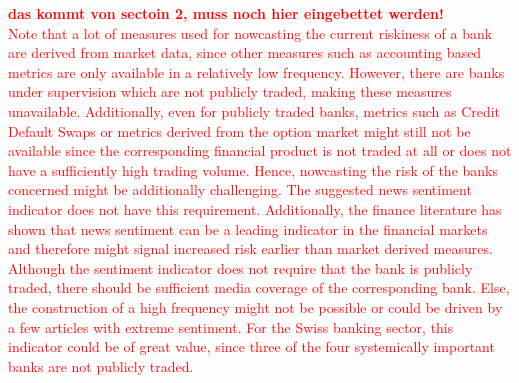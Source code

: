 
\textcolor{red}{
\textbf{das kommt von sectoin 2, muss noch hier eingebettet werden!}\\
Note that a lot of measures used for nowcasting the current riskiness of a bank are derived from market data, since other measures such as accounting based metrics are only available in a relatively low frequency. However, there are banks under supervision which are not publicly traded, making these measures unavailable. Additionally, even for publicly traded banks, metrics such as Credit Default Swaps or metrics derived from the option market might still not be available since the corresponding financial product is not traded at all or does not have a sufficiently high trading volume. Hence, nowcasting the risk of the banks concerned might be additionally challenging. The suggested news sentiment indicator does not have this requirement. Additionally, the finance literature has shown that news sentiment can be a leading indicator in the financial markets and therefore might signal increased risk earlier than market derived measures. Although the sentiment indicator does not require that the bank is publicly traded, there should be sufficient media coverage of the corresponding bank. Else, the construction of a high frequency might not be possible or could be driven by a few articles with extreme sentiment. For the Swiss banking sector, this indicator could be of great value, since three of the four systemically important banks are not publicly traded.
}

\cleardoublepage
